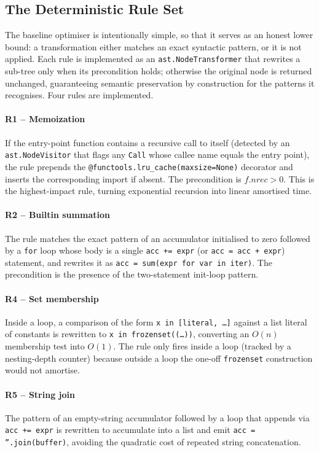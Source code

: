 \documentclass[conference]{IEEEtran}
\begin{document}
\subsection{The Deterministic Rule Set}
\label{sec:rule_set}

The baseline optimiser is intentionally simple, so that it serves as an honest lower bound: a transformation either matches an exact syntactic pattern, or it is not applied. Each rule is implemented as an \texttt{ast.NodeTransformer} that rewrites a sub-tree only when its precondition holds; otherwise the original node is returned unchanged, guaranteeing semantic preservation by construction for the patterns it recognises. Four rules are implemented.

\paragraph{R1 -- Memoization} If the entry-point function contains a recursive call to itself (detected by an \texttt{ast.NodeVisitor} that flags any \texttt{Call} whose callee name equals the entry point), the rule prepends the \texttt{@functools.lru\_cache(maxsize=None)} decorator and inserts the corresponding import if absent. The precondition is $f.\mathit{nrec} > 0$. This is the highest-impact rule, turning exponential recursion into linear amortised time.

\paragraph{R2 -- Builtin summation} The rule matches the exact pattern of an accumulator initialised to zero followed by a \texttt{for} loop whose body is a single \texttt{acc += expr} (or \texttt{acc = acc + expr}) statement, and rewrites it as \texttt{acc = sum(expr for var in iter)}. The precondition is the presence of the two-statement init-loop pattern.

\paragraph{R4 -- Set membership} Inside a loop, a comparison of the form \texttt{x in [literal, \ldots]} against a list literal of constants is rewritten to \texttt{x in frozenset((\ldots))}, converting an $O(n)$ membership test into $O(1)$. The rule only fires inside a loop (tracked by a nesting-depth counter) because outside a loop the one-off \texttt{frozenset} construction would not amortise.

\paragraph{R5 -- String join} The pattern of an empty-string accumulator followed by a loop that appends via \texttt{acc += expr} is rewritten to accumulate into a list and emit \texttt{acc = ''.join(buffer)}, avoiding the quadratic cost of repeated string concatenation.
\end{document}
